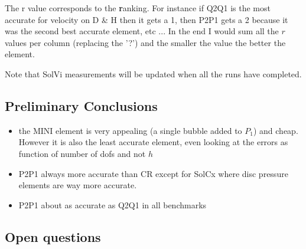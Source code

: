 The r value corresponds to the \textbf{r}anking. For instance if Q2Q1 is the most accurate for velocity on D \& H then it gets a 1, then P2P1 gets a 2 because it was the second best accurate element, etc ...
In the end I would sum all the $r$ values per column (replacing the '?') 
and the smaller the value the better the element. 

Note that SolVi measurements will be updated when all the runs have completed.  







\subsection*{Preliminary Conclusions}

\begin{itemize}
\item the MINI element is very appealing (a single bubble added to $P_1$) and cheap. However it is also 
the least accurate element, even looking at the errors as function of number of dofs and not $h$
\item P2P1 always more accurate than CR except for SolCx where disc pressure elements are way more accurate.
\item P2P1 about as accurate as Q2Q1 in all benchmarks
\end{itemize}


\subsection*{Open questions}


